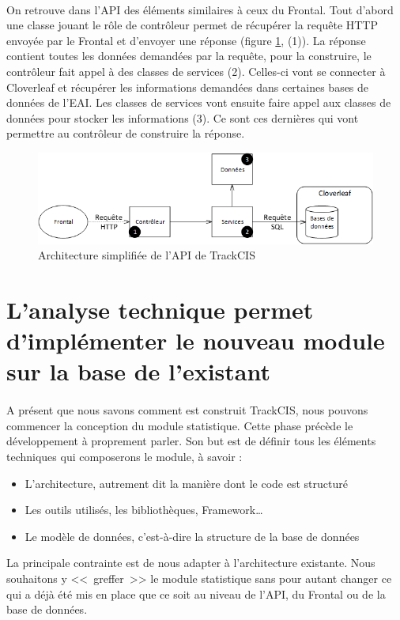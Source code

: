 			\paragraph{}
			On retrouve dans l'API des éléments similaires à ceux du Frontal. Tout
			d'abord une classe jouant le rôle de contrôleur permet de récupérer la requête HTTP
			envoyée par le Frontal et d'envoyer une réponse (figure
			\ref{archi_actuelle_api}, (1)). La réponse contient toutes les données
			demandées par la requête, pour la construire, le contrôleur fait appel à des
			classes de services (2). Celles-ci vont se connecter à Cloverleaf et
			récupérer les informations demandées dans certaines bases de données de l'EAI. Les
			classes de services vont ensuite faire appel aux classes de données pour
			stocker les informations (3). Ce sont ces dernières qui vont permettre au
			contrôleur de construire la réponse.
			\begin{figure}[H]
				\centering
				\includegraphics[width=12cm]{../img/part3/archi_actuelle_api.png}
				\caption{\label{archi_actuelle_api} Architecture simplifiée de l'API de
				TrackCIS}
			\end{figure}
	
	\section{L'analyse technique permet d'implémenter le nouveau module sur la base
	de l'existant}
		\paragraph{}
		A présent que nous savons comment est construit TrackCIS, nous pouvons
		commencer la conception du module statistique. Cette phase précède le
		développement à proprement parler. Son but est de définir tous les
		éléments techniques qui composerons le module, à savoir :
		\begin{itemize}
		  \item L'architecture, autrement dit la manière dont le code est structuré
		  \item Les outils utilisés, les bibliothèques, Framework\ldots
		  \item Le modèle de données, c'est-à-dire la structure de la base de données
		\end{itemize}
		La principale contrainte est de nous adapter à l'architecture existante. Nous
		souhaitons y <<~greffer~>> le module statistique sans pour autant changer ce
		qui a déjà été mis en place que ce soit au niveau de l'API, du Frontal ou de la
		base de données.
		
